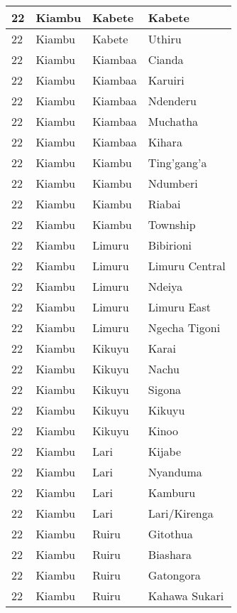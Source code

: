 \begin{table}[!ht]
\begin{tabular}{|l|l|l|l|}
        22 & Kiambu & Kabete & Kabete \\ \hline
        22 & Kiambu & Kabete & Uthiru \\ \hline
        22 & Kiambu & Kiambaa & Cianda \\ \hline
        22 & Kiambu & Kiambaa & Karuiri \\ \hline
        22 & Kiambu & Kiambaa & Ndenderu \\ \hline
        22 & Kiambu & Kiambaa & Muchatha \\ \hline
        22 & Kiambu & Kiambaa & Kihara \\ \hline
        22 & Kiambu & Kiambu & Ting’gang’a \\ \hline
        22 & Kiambu & Kiambu & Ndumberi \\ \hline
        22 & Kiambu & Kiambu & Riabai \\ \hline
        22 & Kiambu & Kiambu & Township \\ \hline
        22 & Kiambu & Limuru & Bibirioni \\ \hline
        22 & Kiambu & Limuru & Limuru Central \\ \hline
        22 & Kiambu & Limuru & Ndeiya \\ \hline
        22 & Kiambu & Limuru & Limuru East \\ \hline
        22 & Kiambu & Limuru & Ngecha Tigoni \\ \hline
        22 & Kiambu & Kikuyu & Karai \\ \hline
        22 & Kiambu & Kikuyu & Nachu \\ \hline
        22 & Kiambu & Kikuyu & Sigona \\ \hline
        22 & Kiambu & Kikuyu & Kikuyu \\ \hline
        22 & Kiambu & Kikuyu & Kinoo \\ \hline
        22 & Kiambu & Lari & Kijabe \\ \hline
        22 & Kiambu & Lari & Nyanduma \\ \hline
        22 & Kiambu & Lari & Kamburu \\ \hline
        22 & Kiambu & Lari & Lari/Kirenga \\ \hline
        22 & Kiambu & Ruiru & Gitothua \\ \hline
        22 & Kiambu & Ruiru & Biashara \\ \hline
        22 & Kiambu & Ruiru & Gatongora \\ \hline
        22 & Kiambu & Ruiru & Kahawa Sukari \\ \hline

\end{tabular}
\end{table}
